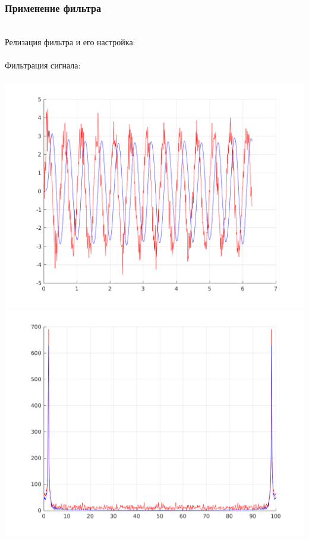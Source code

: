 \documentclass[a4paper]{article}
\begin{document}
\subsubsection{Применение фильтра}\\
Релизация фильтра и его настройка:\\
\newpage
\\
Фильтрация сигнала:\\
\\
\includegraphics[scale=0.7]{lab3/figures/figure_4.png}\\
\includegraphics[scale=0.7]{lab3/figures/figure_5.png}\\
\end{document}
